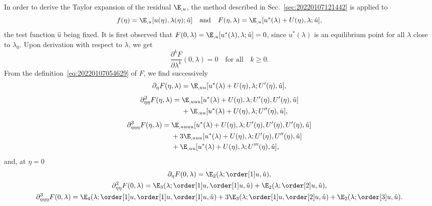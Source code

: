 In order to derive the Taylor expansion of the residual $\E_{,u}$, the method described in Sec.~\ref{sec:20220107121442}
is applied to
\begin{equation}
  \label{eq:20220107054629}
  f(\eta) = \E_{, u} [u(\eta), \lambda(\eta); \hat{u}]
  \quad \text{and} \quad
  F(\eta, \lambda) = \E_{, u}[u^{\ast}(\lambda) + U(\eta), \lambda; \hat{u}],
\end{equation}
the test function $\hat{u}$ being fixed. It is first observed that
$F(0, \lambda) = \E_{, u} [u^{\ast} (\lambda), \lambda; \hat{u}] = 0$, since $u^{\ast}(\lambda)$ is an equilibrium point
for all $\lambda$ close to $\lambda_0$. Upon derivation with respect to $\lambda$, we get
\begin{equation*}
  \frac{\partial^k F}{\partial \lambda^k}(0, \lambda) = 0 \quad \text{for all} \quad k \geq 0.
\end{equation*}
From the definition~\eqref{eq:20220107054629} of $F$, we find successively
\begin{equation*}
  \partial_{\eta}F(\eta, \lambda) = \E_{, u u}[u^{\ast}(\lambda) + U(\eta), \lambda; U'(\eta), \hat{u}],
\end{equation*}
\begin{equation*}
  \begin{aligned}[b]
    \partial_{\eta \eta}^2 F(\eta, \lambda) ={}
    & \E_{, uuu}[u^{\ast}(\lambda) + U(\eta), \lambda; U'(\eta), U'(\eta), \hat{u}]\\
    & + \E_{, uu} [u^{\ast}(\lambda) + U(\eta), \lambda; U''(\eta), \hat{u}],
  \end{aligned}
\end{equation*}
\begin{equation*}
  \begin{aligned}[b]
    \partial_{\eta\eta\eta}^3 F(\eta, \lambda) ={}
    & \E_{, uuuu}[u^{\ast}(\lambda) + U(\eta), \lambda; U'(\eta), U'(\eta), U'(\eta), \hat{u}]\\
    & + 3\E_{, u u u}[u^{\ast}(\lambda) + U(\eta), \lambda; U'(\eta), U''(\eta), \hat{u}]\\
    & + \E_{, uu}[u^{\ast}(\lambda) + U(\eta), \lambda; U'''(\eta), \hat{u}],
  \end{aligned}
\end{equation*}
and, at $\eta = 0$
\begin{gather*}
  \partial_{\eta}F(0, \lambda) = \E_2(\lambda; \order[1]u, \hat{u}),\\
  \partial_{\eta\eta}^2 F(0, \lambda) = \E_3(\lambda; \order[1]u, \order[1]u, \hat{u}) + \E_2(\lambda; \order[2]u, \hat{u}),\\
  \partial_{\eta\eta\eta}^3 F(0, \lambda) = \E_4(\lambda; \order[1]u, \order[1]u, \order[1]u, \hat{u}) + 3\E_3(\lambda; \order[1]u, \order[2]u, \hat{u}) + \E_2(\lambda; \order[3]u, \hat{u}).
\end{gather*}
